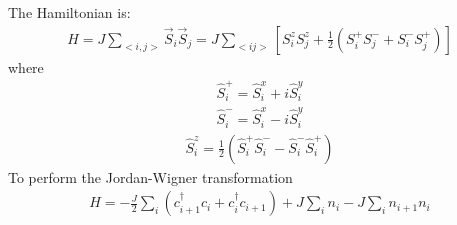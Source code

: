 \documentclass[letterpaper,10pt,english]{sphinxmanual}
\begin{document}
The Hamiltonian is:
\begin{equation*}
\begin{split}H=J\sum_{<i,j>}\vec{S}_{i}\vec{S}_{j} =
J\sum_{<ij>}\left[S^{z}_{i}S^{z}_{j} +
\frac{1}{2}\left(S^{+}_{i}S^{-}_{j}+S^{-}_{i}S^{+}_{j}\right)\right]\end{split}
\end{equation*}
where
\begin{equation*}
\begin{split}\hat{S}_{i}^{+} = \hat{S}_{i}^{x} + i\hat{S}_{i}^{y}\end{split}
\end{equation*}\begin{equation*}
\begin{split}\hat{S}_{i}^{-} = \hat{S}_{i}^{x} - i\hat{S}_{i}^{y}\end{split}
\end{equation*}\begin{equation*}
\begin{split}\hat{S}_{i}^{z} = \frac{1}{2}(\hat{S}_{i}^{+}\hat{S}_{i}^{-}-\hat{S}_{i}^{-}\hat{S}_{i}^{+})\end{split}
\end{equation*}
To perform the Jordan-Wigner transformation
\begin{equation*}
\begin{split}H=-\frac{J}{2}\sum_{i}\left(c^{\dagger}_{i+1}c_{i}+c^{\dagger}_{i}c_{i+1}\right)
+J\sum_{i}n_{i} - J\sum_{i}n_{i+1}n_{i}\end{split}
\end{equation*}
\def\sphinxLiteralBlockLabel{\label{\detokenize{user_model_system:id9}}}
%
\end{document}
